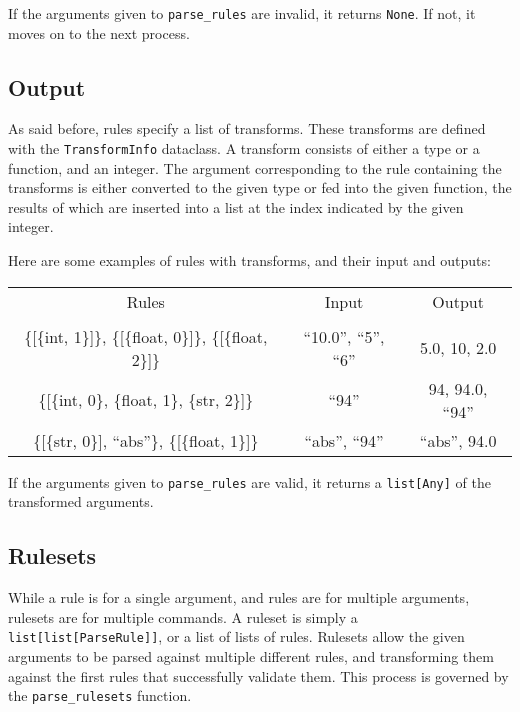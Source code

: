 \documentclass{article}
\begin{document}
				If the arguments given to \verb|parse_rules| are invalid, it returns \verb|None|.
				If not, it moves on to the next process.

		\subsection{Output}
			As said before, rules specify a list of transforms. These transforms are defined
			with the \verb|TransformInfo| dataclass. A transform consists of either a type or
			a function, and an integer. The argument corresponding to the rule containing the
			transforms is either converted to the given type or fed into the given function,
			the results of which are inserted into a list at the index indicated by the given
			integer.

			Here are some examples of rules with transforms, and their input and outputs:

			\begin{center}
				\begin{tabular}{c c c}
					Rules & Input & Output \\
					\\
						\{[\{int, 1\}]\}, \{[\{float, 0\}]\}, \{[\{float, 2\}]\} &
						``10.0'', ``5'', ``6'' &
						5.0, 10, 2.0
					\\
						\{[\{int, 0\}, \{float, 1\}, \{str, 2\}]\} &
						``94'' &
						94, 94.0, ``94''
					\\
						\{[\{str, 0\}], ``abs''\}, \{[\{float, 1\}]\} &
						``abs'', ``94'' &
						``abs'', 94.0
					\\
				\end{tabular}
			\end{center}

			If the arguments given to \verb|parse_rules| are valid, it returns a \verb|list[Any]|
			of the transformed arguments.

			\subsection{Rulesets}
			While a rule is for a single argument, and rules are for multiple arguments, rulesets
			are for multiple commands. A ruleset is simply a \verb|list[list[ParseRule]]|, or a
			list of lists of rules. Rulesets allow the given arguments to be parsed against
			multiple different rules, and transforming them against the first rules that
			successfully validate them. This process is governed by the \verb|parse_rulesets|
			function.
\end{document}
